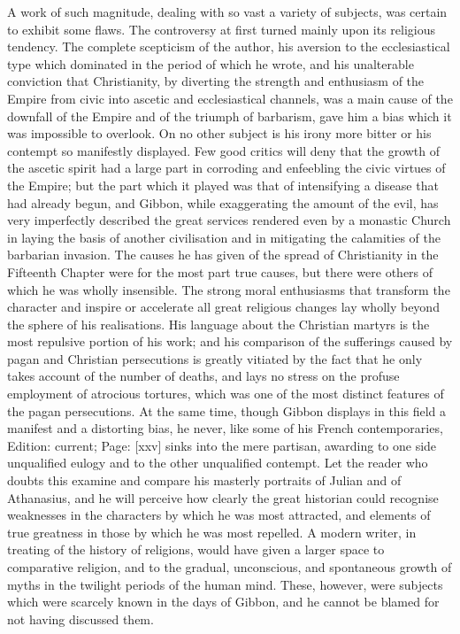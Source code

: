 A work of such magnitude, dealing with so vast a variety of subjects, was certain to exhibit some flaws. The controversy at first turned mainly upon its religious tendency. The complete scepticism of the author, his aversion to the ecclesiastical type which dominated in the period of which he wrote, and his unalterable conviction that Christianity, by diverting the strength and enthusiasm of the Empire from civic into ascetic and ecclesiastical channels, was a main cause of the downfall of the Empire and of the triumph of barbarism, gave him a bias which it was impossible to overlook. On no other subject is his irony more bitter or his contempt so manifestly displayed. Few good critics will deny that the growth of the ascetic spirit had a large part in corroding and enfeebling the civic virtues of the Empire; but the part which it played was that of intensifying a disease that had already begun, and Gibbon, while exaggerating the amount of the evil, has very imperfectly described the great services rendered even by a monastic Church in laying the basis of another civilisation and in mitigating the calamities of the barbarian invasion. The causes he has given of the spread of Christianity in the Fifteenth Chapter were for the most part true causes, but there were others of which he was wholly insensible. The strong moral enthusiasms that transform the character and inspire or accelerate all great religious changes lay wholly beyond the sphere of his realisations. His language about the Christian martyrs is the most repulsive portion of his work; and his comparison of the sufferings caused by pagan and Christian persecutions is greatly vitiated by the fact that he only takes account of the number of deaths, and lays no stress on the profuse employment of atrocious tortures, which was one of the most distinct features of the pagan persecutions. At the same time, though Gibbon displays in this field a manifest and a distorting bias, he never, like some of his French contemporaries, Edition: current; Page: [xxv] sinks into the mere partisan, awarding to one side unqualified eulogy and to the other unqualified contempt. Let the reader who doubts this examine and compare his masterly portraits of Julian and of Athanasius, and he will perceive how clearly the great historian could recognise weaknesses in the characters by which he was most attracted, and elements of true greatness in those by which he was most repelled. A modern writer, in treating of the history of religions, would have given a larger space to comparative religion, and to the gradual, unconscious, and spontaneous growth of myths in the twilight periods of the human mind. These, however, were subjects which were scarcely known in the days of Gibbon, and he cannot be blamed for not having discussed them.

